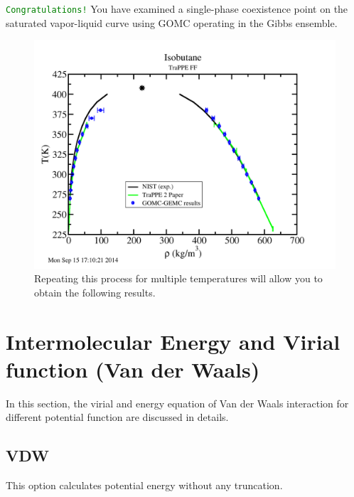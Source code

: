 \textcolor{green}{\texttt{Congratulations!}} You have examined a single-phase coexistence point on the saturated vapor-liquid curve using GOMC operating in the Gibbs ensemble.
\begin{figure}[H]
\centering
\includegraphics[scale=0.5]{images/isobutane_result}
\caption{Repeating this process for multiple temperatures will allow you to obtain the following results.}
\end{figure}
\newpage
\section{Intermolecular Energy and Virial function (Van der Waals)}
In this section, the virial and energy equation of Van der Waals interaction for different potential function are discussed in details.
\subsection{VDW} This option calculates potential energy without any truncation.

